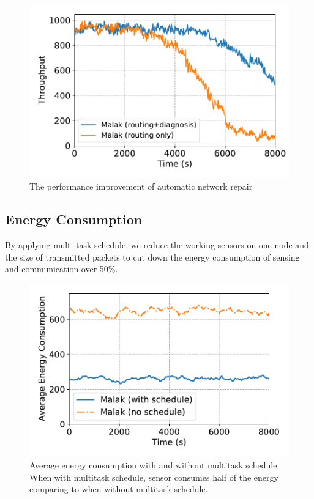 \begin{figure}[htbp]
	\centering
	\includegraphics[width=.95\columnwidth]{Figure/diagnosis}
	\vspace{-0.1in}
	\caption{The performance improvement of automatic network repair
		\textnormal{
		}}
	\label{fig:diagnosis}
\end{figure}

\subsection{Energy Consumption}

By applying multi-task schedule, we reduce the working sensors on one node and
the size of transmitted packets to cut down the energy consumption of sensing
and communication over 50\%.

\begin{figure}[htbp]
	\centering
	\includegraphics[width=.95\columnwidth]{Figure/multitask_energy}
	\vspace{-0.1in}
	\caption{Average energy consumption with and without multitask schedule
		\textnormal{When with multitask schedule, sensor consumes half of the energy
			comparing to when without multitask schedule.}}
	\label{fig:multitask_energy}
\end{figure}

